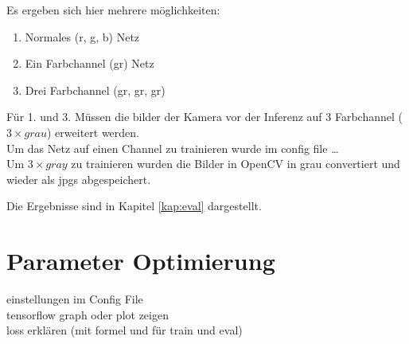 Es ergeben sich hier mehrere möglichkeiten:

\begin{enumerate}
    \item Normales (r, g, b) Netz
    \item Ein Farbchannel (gr) Netz
    \item Drei Farbchannel (gr, gr, gr)
\end{enumerate}

Für 1. und 3. Müssen die bilder der Kamera vor der 
Inferenz auf 3 Farbchannel ($3 \times grau$) erweitert werden.
\\
Um das Netz auf einen Channel zu trainieren wurde im config file \dots
\\
Um $3 \times gray$ zu trainieren wurden die Bilder in OpenCV in 
grau convertiert und wieder als jpgs abgespeichert.

Die Ergebnisse sind in Kapitel \ref{kap:eval} dargestellt.


\section{Parameter Optimierung}
einstellungen im Config File\\
tensorflow graph oder plot zeigen\\
loss erklären (mit formel und für train und eval)


